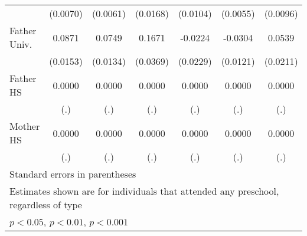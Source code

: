 \begin{table}[htbp]
\begin{tabular}{l*{6}{c}}
            &    (0.0070)         &    (0.0061)         &    (0.0168)         &    (0.0104)         &    (0.0055)         &    (0.0096)         \\
\addlinespace
Father Univ.&      0.0871\sym{***}&      0.0749\sym{***}&      0.1671\sym{***}&     -0.0224         &     -0.0304\sym{*}  &      0.0539\sym{*}  \\
            &    (0.0153)         &    (0.0134)         &    (0.0369)         &    (0.0229)         &    (0.0121)         &    (0.0211)         \\
\addlinespace
Father HS   &      0.0000         &      0.0000         &      0.0000         &      0.0000         &      0.0000         &      0.0000         \\
            &         (.)         &         (.)         &         (.)         &         (.)         &         (.)         &         (.)         \\
\addlinespace
Mother HS   &      0.0000         &      0.0000         &      0.0000         &      0.0000         &      0.0000         &      0.0000         \\
            &         (.)         &         (.)         &         (.)         &         (.)         &         (.)         &         (.)         \\
\bottomrule
\multicolumn{7}{l}{\footnotesize Standard errors in parentheses}\\
\multicolumn{7}{l}{\footnotesize Estimates shown are for individuals that attended any preschool, regardless of type}\\
\multicolumn{7}{l}{\footnotesize \sym{*} \(p<0.05\), \sym{**} \(p<0.01\), \sym{***} \(p<0.001\)}\\
\end{tabular}
\end{table}
